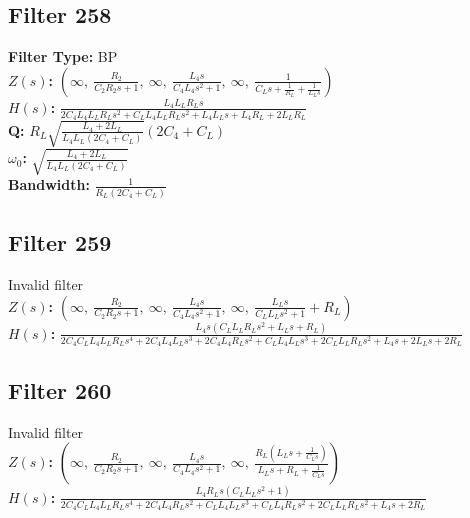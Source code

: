 \documentclass{article}
\begin{document}
\subsection*{Filter 258}
\textbf{Filter Type:} BP \\ 
\textbf{$Z(s)$:} $\left( \infty, \  \frac{R_{2}}{C_{2} R_{2} s + 1}, \  \infty, \  \frac{L_{4} s}{C_{4} L_{4} s^{2} + 1}, \  \infty, \  \frac{1}{C_{L} s + \frac{1}{R_{L}} + \frac{1}{L_{L} s}}\right)$ \\ 
\textbf{$H(s)$:} $\frac{L_{4} L_{L} R_{L} s}{2 C_{4} L_{4} L_{L} R_{L} s^{2} + C_{L} L_{4} L_{L} R_{L} s^{2} + L_{4} L_{L} s + L_{4} R_{L} + 2 L_{L} R_{L}}$ \\ 
\textbf{Q:} $R_{L} \sqrt{\frac{L_{4} + 2 L_{L}}{L_{4} L_{L} \left(2 C_{4} + C_{L}\right)}} \left(2 C_{4} + C_{L}\right)$ \\ 
\textbf{$\omega_0$:} $\sqrt{\frac{L_{4} + 2 L_{L}}{L_{4} L_{L} \left(2 C_{4} + C_{L}\right)}}$ \\ 
\textbf{Bandwidth:} $\frac{1}{R_{L} \left(2 C_{4} + C_{L}\right)}$ \\ 
\subsection*{Filter 259}
Invalid filter \\ 
\textbf{$Z(s)$:} $\left( \infty, \  \frac{R_{2}}{C_{2} R_{2} s + 1}, \  \infty, \  \frac{L_{4} s}{C_{4} L_{4} s^{2} + 1}, \  \infty, \  \frac{L_{L} s}{C_{L} L_{L} s^{2} + 1} + R_{L}\right)$ \\ 
\textbf{$H(s)$:} $\frac{L_{4} s \left(C_{L} L_{L} R_{L} s^{2} + L_{L} s + R_{L}\right)}{2 C_{4} C_{L} L_{4} L_{L} R_{L} s^{4} + 2 C_{4} L_{4} L_{L} s^{3} + 2 C_{4} L_{4} R_{L} s^{2} + C_{L} L_{4} L_{L} s^{3} + 2 C_{L} L_{L} R_{L} s^{2} + L_{4} s + 2 L_{L} s + 2 R_{L}}$ \\ 
\subsection*{Filter 260}
Invalid filter \\ 
\textbf{$Z(s)$:} $\left( \infty, \  \frac{R_{2}}{C_{2} R_{2} s + 1}, \  \infty, \  \frac{L_{4} s}{C_{4} L_{4} s^{2} + 1}, \  \infty, \  \frac{R_{L} \left(L_{L} s + \frac{1}{C_{L} s}\right)}{L_{L} s + R_{L} + \frac{1}{C_{L} s}}\right)$ \\ 
\textbf{$H(s)$:} $\frac{L_{4} R_{L} s \left(C_{L} L_{L} s^{2} + 1\right)}{2 C_{4} C_{L} L_{4} L_{L} R_{L} s^{4} + 2 C_{4} L_{4} R_{L} s^{2} + C_{L} L_{4} L_{L} s^{3} + C_{L} L_{4} R_{L} s^{2} + 2 C_{L} L_{L} R_{L} s^{2} + L_{4} s + 2 R_{L}}$ \\ 
\end{document}
